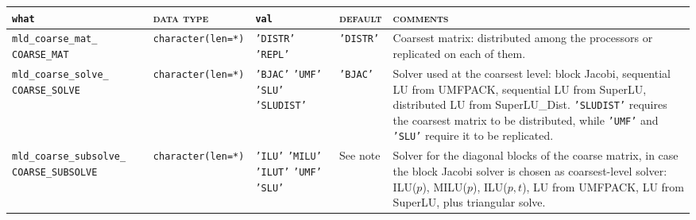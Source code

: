 \bsideways
\begin{center}
\begin{tabular}{|p{3.5cm}|l|p{3.2cm}|l|p{5cm}|}
\hline
\verb|what|              & \textsc{data type}        &  \verb|val|      &  \textsc{default}  &
\textsc{comments} \\ \hline
\verb|mld_coarse_mat_|  \break \verb|COARSE_MAT|  & \verb|character(len=*)|
                         & \texttt{'DISTR'} \hspace{2.5cm} \texttt{'REPL'}
                         & \texttt{'DISTR'}
                         & Coarsest matrix: distributed among the processors or
                           replicated on each of them. \\ \hline
\verb|mld_coarse_solve_| \break \verb|COARSE_SOLVE| & \verb|character(len=*)|
                         & \texttt{'BJAC'} \hspace{2.5cm} \texttt{'UMF'} \hspace{2.5cm}
                           \texttt{'SLU'} \hspace{2.5cm} \texttt{'SLUDIST'}
                         & \texttt{'BJAC'}
                         & Solver used at the coarsest level: block Jacobi, sequential
                           LU from UMFPACK, sequential LU from SuperLU, 
                           distributed LU from SuperLU\_Dist.
                           \texttt{'SLUDIST'} requires the coarsest 
                           matrix to be distributed, while \texttt{'UMF'} and
                           \texttt{'SLU'} require it to be replicated. \\ \hline
\verb|mld_coarse_subsolve_| \break \verb|COARSE_SUBSOLVE| & \verb|character(len=*)|
                         & \texttt{'ILU'} \hspace{2.5cm} \texttt{'MILU'}
                           \hspace{2.5cm} \texttt{'ILUT'}
                           \hspace{2.5cm} \texttt{'UMF'} \hspace{2.5cm} \texttt{'SLU'}
                         & See note
                         & Solver for the diagonal blocks of the coarse matrix,
                           in case the block Jacobi solver
                           is chosen as coarsest-level solver: ILU($p$), MILU($p$),
                           ILU($p,t$), LU from UMFPACK,
                           LU from SuperLU, plus triangular solve. \\ \hline

\end{tabular}
\end{center}
